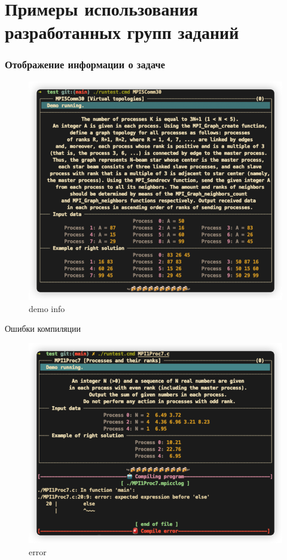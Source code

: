 \section{Примеры использования разработанных групп заданий}

\begin{frame}
\frametitle{Отображение информации о задаче}

\begin{figure}[htbp]%
    \centering
    \includegraphics[width=0.65
    \linewidth]{images/example.jpg}%
    \caption{demo info}%
    \label{demo}%
\end{figure}


\end{frame}


\begin{frame}{Ошибки компиляции}

\begin{figure}[htbp]%
    \centering
    \includegraphics[width=0.65
    \linewidth]{images/error.jpg}%
    \caption{error}%
    \label{error}%
\end{figure}
    
\end{frame}


